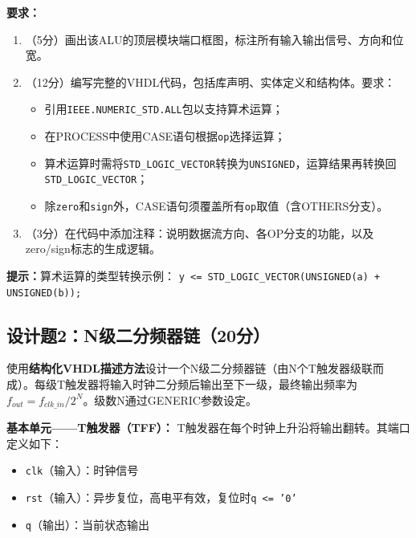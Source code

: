 \vspace{0.3cm}

\textbf{要求：}
\begin{enumerate}[label=(\arabic*)]
  \item （5分）画出该ALU的顶层模块端口框图，标注所有输入输出信号、方向和位宽。
  \item （12分）编写完整的VHDL代码，包括库声明、实体定义和结构体。要求：
  \begin{itemize}
    \item 引用\texttt{IEEE.NUMERIC\_STD.ALL}包以支持算术运算；
    \item 在PROCESS中使用CASE语句根据\texttt{op}选择运算；
    \item 算术运算时需将\texttt{STD\_LOGIC\_VECTOR}转换为\texttt{UNSIGNED}，运算结果再转换回\texttt{STD\_LOGIC\_VECTOR}；
    \item 除\texttt{zero}和\texttt{sign}外，CASE语句须覆盖所有\texttt{op}取值（含OTHERS分支）。
  \end{itemize}
  \item （3分）在代码中添加注释：说明数据流方向、各OP分支的功能，以及zero/sign标志的生成逻辑。
\end{enumerate}

\begin{framed}
\textbf{提示：}算术运算的类型转换示例：
\texttt{y <= STD\_LOGIC\_VECTOR(UNSIGNED(a) + UNSIGNED(b));}
\end{framed}

\newpage

\subsection*{设计题2：N级二分频器链（20分）}

使用\textbf{结构化VHDL描述方法}设计一个N级二分频器链（由N个T触发器级联而成）。每级T触发器将输入时钟二分频后输出至下一级，最终输出频率为 $f_{out} = f_{clk\_in} / 2^{N}$。级数N通过GENERIC参数设定。

\vspace{0.3cm}

\textbf{基本单元——T触发器（TFF）：}
T触发器在每个时钟上升沿将输出翻转。其端口定义如下：
\begin{itemize}
  \item \texttt{clk}（输入）：时钟信号
  \item \texttt{rst}（输入）：异步复位，高电平有效，复位时\texttt{q <= '0'}
  \item \texttt{q}（输出）：当前状态输出
\end{itemize}

